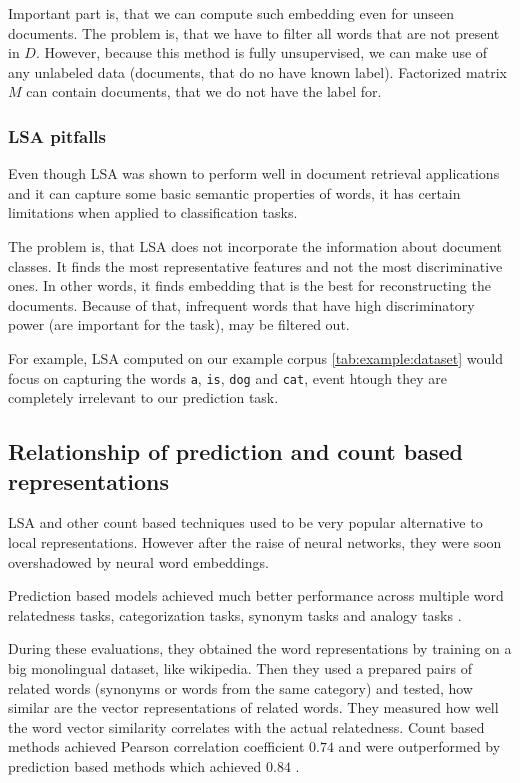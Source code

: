     Important part is, that we can compute such embedding even for unseen documents.
    The problem is, that we have to filter all words that are not present in $D$. 
    However, because this method is fully unsupervised, we can make use of any unlabeled data (documents, that do no have known label). 
    Factorized matrix $M$ can contain documents, that we do not have the label for.
    
    \subsubsection{LSA pitfalls}

    Even though LSA was shown to perform well in document retrieval applications and it can capture some basic semantic properties of words,
    it has certain limitations when applied to classification tasks. 
    
    The problem is, that LSA does not incorporate the information about document classes. 
    It finds the most representative features and not the most discriminative ones.
    In other words, it finds embedding that is the best for reconstructing the documents.
    Because of that, infrequent words that have high discriminatory power (are important for the task), may be filtered out.
    
    For example, LSA computed on our example corpus \ref{tab:example:dataset} would focus on capturing the words \texttt{a}, \texttt{is}, \texttt{dog} and \texttt{cat},
    event htough they are completely irrelevant to our prediction task.
    
    
    \subsection{Relationship of prediction and count based representations}
        
    LSA and other count based techniques used to be very popular alternative to local representations.
    However after the raise of neural networks, they were soon overshadowed by neural word embeddings.
    
    Prediction based models achieved much better performance across multiple word relatedness tasks, categorization tasks, synonym tasks and analogy tasks \cite{baroni2014don}. %
    
    During these evaluations, they obtained the word representations by training on a big monolingual dataset, like wikipedia.
    Then they used a prepared pairs of related words (synonyms or words from the same category) and tested,
    how similar are the vector representations of related words. 
    They measured how well the word vector similarity correlates with the actual relatedness. 
    Count based methods achieved Pearson correlation coefficient $0.74$ and were outperformed by prediction based methods which achieved $0.84$ \cite{baroni2014don}.
    
